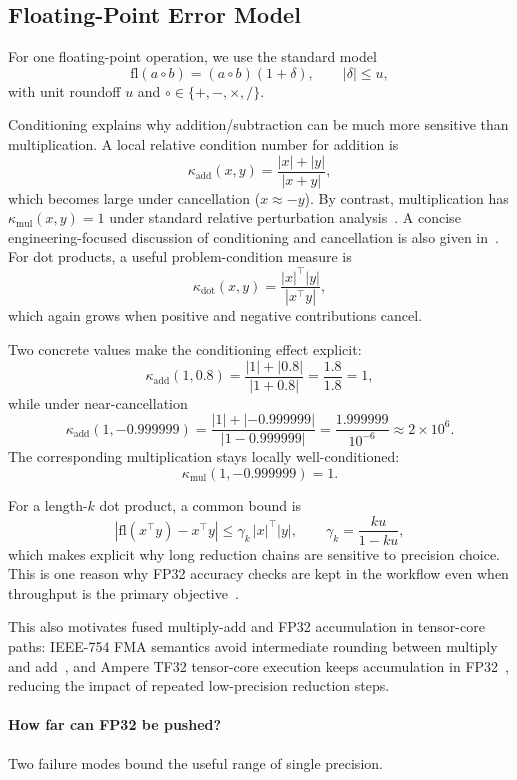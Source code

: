 \subsection{Floating-Point Error Model}\label{sec:floating-point-error}

For one floating-point operation, we use the standard model
\[
  \mathrm{fl}(a \circ b) = (a \circ b)(1+\delta),
  \qquad
  |\delta| \le u,
\]
with unit roundoff $u$ and $\circ\in\{+,-,\times,/\}$.

Conditioning explains why addition/subtraction can be much more sensitive than
multiplication. A local relative condition number for addition is
\[
  \kappa_{\mathrm{add}}(x,y)=\frac{|x|+|y|}{|x+y|},
\]
which becomes large under cancellation ($x \approx -y$). By contrast,
multiplication has $\kappa_{\mathrm{mul}}(x,y)=1$ under standard relative
perturbation analysis~\cite{higham2002accuracy}. A concise engineering-focused
discussion of conditioning and cancellation is also given
in~\cite{dahmen2022numerik}. For dot products, a useful
problem-condition measure is
\[
  \kappa_{\mathrm{dot}}(x,y)=\frac{|x|^\top|y|}{|x^\top y|},
\]
which again grows when positive and negative contributions cancel.

Two concrete values make the conditioning effect explicit:
\[
  \kappa_{\mathrm{add}}(1,0.8)
  =\frac{|1|+|0.8|}{|1+0.8|}
  =\frac{1.8}{1.8}
  =1,
\]
while under near-cancellation
\[
  \kappa_{\mathrm{add}}(1,-0.999999)
  =\frac{|1|+|{-0.999999}|}{|1-0.999999|}
  =\frac{1.999999}{10^{-6}}
  \approx 2\times 10^{6}.
\]
The corresponding multiplication stays locally well-conditioned:
\[
  \kappa_{\mathrm{mul}}(1,-0.999999)=1.
\]

For a length-$k$ dot product, a common bound is
\[
  \left|\mathrm{fl}(x^\top y)-x^\top y\right|
  \le
  \gamma_k\,|x|^\top|y|,
  \qquad
  \gamma_k = \frac{k u}{1-k u},
\]
which makes explicit why long reduction chains are sensitive to precision
choice. This is one reason why FP32 accuracy checks are kept in the workflow
even when throughput is the primary objective~\cite{higham2022mixed}.

This also motivates fused multiply-add and FP32 accumulation in tensor-core
paths: IEEE-754 FMA semantics avoid intermediate rounding between multiply and
add~\cite{ieee754-2019}, and Ampere TF32 tensor-core execution keeps
accumulation in FP32~\cite{nvidia2020a100}, reducing the impact of repeated
low-precision reduction steps.

\paragraph{How far can FP32 be pushed?}
Two failure modes bound the useful range of single precision.

